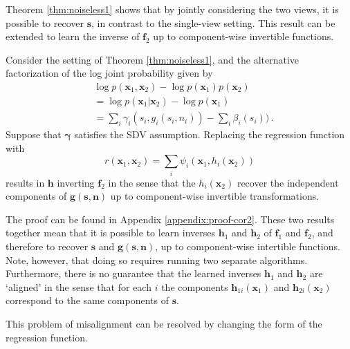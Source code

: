 Theorem \ref{thm:noiseless1} shows that by jointly considering the two views, it is possible to recover $\bm{s}$, in contrast to the single-view setting.
This result can be extended to learn the inverse of $\bm{f}_2$ up to component-wise invertible functions.

\medskip

\begin{corollary}
	\label{crl:noiseless1}
	Consider the setting of Theorem \ref{thm:noiseless1}, and the alternative factorization of the log joint probability given by
	\begin{align}
	&\log p(\bm{x}_1, \bm{x}_2) - \log p(\bm{x}_1) p(\bm{x}_2) \nonumber \\
	&= \log p(\bm{x}_1 | \bm{x}_2) - \log p(\bm{x}_1)\nonumber \\
	&= \sum_i \gamma_i(s_{i}, g_i(s_i, n_i)) - \sum_i \beta_i(s_i)) \label{eq:logdens_noiesless_2}\,.
	\end{align}
	Suppose that $\bm{\gamma}$ satisfies the SDV assumption.
	Replacing the regression function with
	\begin{equation*}
	r(\bm{x}_{1},\bm{x}_{2})=\sum_{i}\psi_{i}(\bm{x}_{1}, h_{i}(\bm{x}_{2}))
	\end{equation*}
	results in $\bm{h}$ inverting $\bm{f}_2$ in the sense that the $h_{i}(\bm{x}_2)$ recover the independent components of $\bm{g}(\bm{s}, \bm{n})$ up  to component-wise invertible transformations.
\end{corollary}The proof can be found in Appendix \ref{appendix:proof-cor2}.
These two results together mean that it is possible to learn inverses $\bm{h}_1$ and $\bm{h}_2$ of $\bm{f}_1$ and $\bm{f}_2$, and therefore to recover $\bm{s}$ and $\bm{g}(\bm{s}, \bm{n})$, up to component-wise intertible functions.
Note, however, that doing so requires running two separate algorithms.
Furthermore, there is no guarantee that the learned inverses $\bm{h}_1$ and $\bm{h}_2$ are `aligned' in the sense that for each $i$ the components $\bm{h}_{1i}(\bm{x}_1)$ and $\bm{h}_{2i}(\bm{x}_2)$ correspond to the same components of $\bm{s}$.

This problem of misalignment can be resolved by changing the form of the regression function.

\medskip

